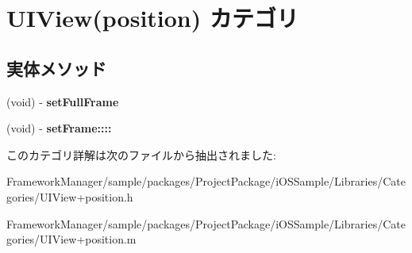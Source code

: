 \hypertarget{category_u_i_view_07position_08}{}\section{U\+I\+View(position) カテゴリ}
\label{category_u_i_view_07position_08}
\subsection*{実体メソッド}
\begin{DoxyCompactItemize}
\item 
\hypertarget{category_u_i_view_07position_08_a9cc44e89e56ed5301ed133ea2bd066b4}{}(void) -\/ {\bfseries set\+Full\+Frame}\label{category_u_i_view_07position_08_a9cc44e89e56ed5301ed133ea2bd066b4}

\item 
\hypertarget{category_u_i_view_07position_08_a194ff395c4f2b5432ba2c3f341256e92}{}(void) -\/ {\bfseries set\+Frame\+::::}\label{category_u_i_view_07position_08_a194ff395c4f2b5432ba2c3f341256e92}

\end{DoxyCompactItemize}


このカテゴリ詳解は次のファイルから抽出されました\+:\begin{DoxyCompactItemize}
\item 
Framework\+Manager/sample/packages/\+Project\+Package/i\+O\+S\+Sample/\+Libraries/\+Categories/U\+I\+View+position.\+h\item 
Framework\+Manager/sample/packages/\+Project\+Package/i\+O\+S\+Sample/\+Libraries/\+Categories/U\+I\+View+position.\+m\end{DoxyCompactItemize}
